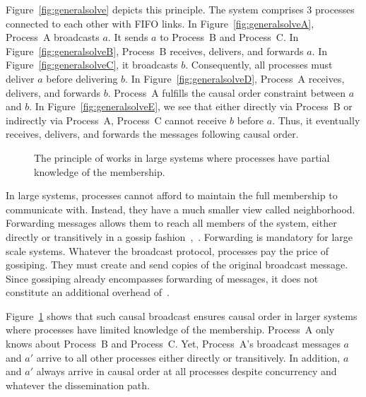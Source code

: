 Figure~\ref{fig:generalsolve} depicts this principle. The system comprises 3
processes connected to each other with FIFO links.  In
Figure~\ref{fig:generalsolveA}, Process~A broadcasts $a$. It sends $a$ to
Process~B and Process~C. In Figure~\ref{fig:generalsolveB}, Process~B receives,
delivers, and forwards $a$. In Figure~\ref{fig:generalsolveC}, it broadcasts
$b$. Consequently, all processes must deliver $a$ before delivering $b$. In
Figure~\ref{fig:generalsolveD}, Process~A receives, delivers, and forwards
$b$. Process~A fulfills the causal order constraint between $a$ and $b$. In
Figure~\ref{fig:generalsolveE}, we see that either directly via Process~B or
indirectly via Process~A, Process~C cannot receive $b$ before $a$. Thus, it
eventually receives, delivers, and forwards the messages following causal order.

\begin{figure}
  \begin{center}
    
    \caption{\label{fig:disseminationtree}The principle of
      \cite{friedman2004causal} works in large systems where processes have
      partial knowledge of the membership.}
  \end{center}
\end{figure}



In large systems, processes cannot afford to maintain the full membership to
communicate with. Instead, they have a much smaller view called
neighborhood. Forwarding messages allows them to reach all members of the
system, either directly or transitively in a gossip
fashion~\cite{demers1987epidemic},~\cite{birman1999bimodal}. Forwarding is
mandatory for large scale systems.  Whatever the broadcast protocol, processes
pay the price of gossiping. They must create and send copies of the original
broadcast message. Since gossiping already encompasses forwarding of messages,
it does not constitute an additional overhead of~\cite{friedman2004causal}.

Figure~\ref{fig:disseminationtree} shows that such causal broadcast ensures
causal order in larger systems where processes have limited knowledge of the
membership.  Process~A only knows about Process~B and Process~C.  Yet,
Process~A's broadcast messages $a$ and $a'$ arrive to all other processes either
directly or transitively. In addition, $a$ and $a'$ always arrive in causal
order at all processes despite concurrency and whatever the dissemination path.

